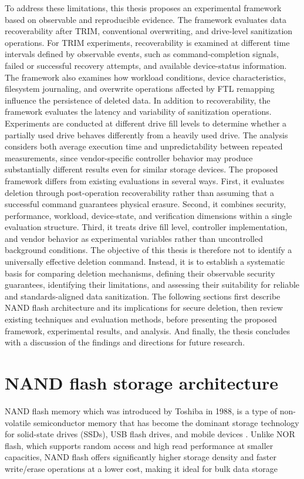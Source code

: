 To address these limitations, this thesis proposes an experimental framework based on observable 
and reproducible evidence. The framework evaluates data recoverability after TRIM, conventional 
overwriting, and drive-level sanitization operations. For TRIM experiments, recoverability is 
examined at different time intervals defined by observable events, such as command-completion 
signals, failed or successful recovery attempts, and available device-status information. The 
framework also examines how workload conditions, device characteristics, filesystem journaling, 
and overwrite operations affected by FTL remapping influence the persistence of deleted data. In 
addition to recoverability, the framework evaluates the latency and variability of sanitization 
operations. Experiments are conducted at different drive fill levels to determine whether a 
partially used drive behaves differently from a heavily used drive. The analysis considers both 
average execution time and unpredictability between repeated measurements, since vendor-specific 
controller behavior may produce substantially different results even for similar storage devices.
The proposed framework differs from existing evaluations in several ways. First, it evaluates 
deletion through post-operation recoverability rather than assuming that a successful command 
guarantees physical erasure. Second, it combines security, performance, workload, device-state, 
and verification dimensions within a single evaluation structure. Third, it treats drive fill 
level, controller implementation, and vendor behavior as experimental variables rather than 
uncontrolled background conditions. The objective of this thesis is therefore not to identify a 
universally effective deletion command. Instead, it is to establish a systematic basis for 
comparing deletion mechanisms, defining their observable security guarantees, identifying their 
limitations, and assessing their suitability for reliable and standards-aligned data sanitization. 
The following sections first describe NAND flash architecture and its implications for secure 
deletion, then review existing techniques and evaluation methods, before presenting the proposed 
framework, experimental results, and analysis. And finally, the thesis concludes with a 
discussion of the findings and directions for future research.


\section {NAND flash storage architecture}
NAND flash memory which was introduced by Toshiba in 1988, is a type of non-volatile 
semiconductor memory that has become the dominant storage technology for solid-state drives 
(SSDs), USB flash drives, and mobile devices \cite{aronsson2025secure}. Unlike NOR flash, 
which supports random access and high read performance at smaller capacities, NAND flash 
offers significantly higher storage density and faster write/erase operations at a lower 
cost, making it ideal for bulk data storage \cite{homaidi2009data}

